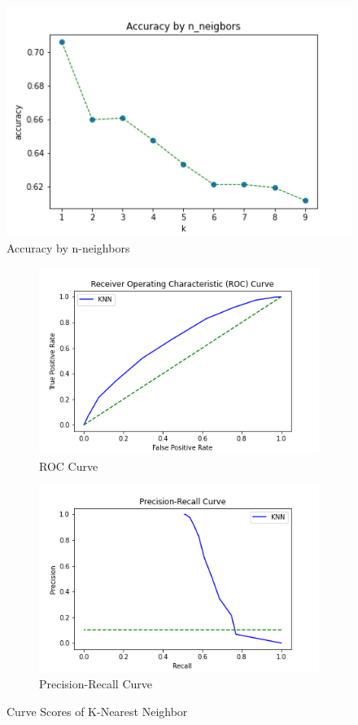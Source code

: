 \documentclass[11pt]{article}
\begin{document}
\begin{figure}[ht]
\centerline{\includegraphics[scale=0.35]{knn_plot.png}}
\label{fig:knnPlot}
\caption{Accuracy by n-neighbors}
\end{figure}

\begin{figure}[ht]
\begin{subfigure}{0.5\textwidth}
\includegraphics[scale=0.45]{roc_knn.png} 
\caption{ROC Curve}
\label{fig:rocKNN}
\end{subfigure}
\begin{subfigure}{0.5\textwidth}
\includegraphics[scale=0.45]{prs_knn.png}
\caption{Precision-Recall Curve}
\label{fig:prsKNN}
\end{subfigure}
\label{fig:csKNN}
\caption{Curve Scores of K-Nearest Neighbor}
\end{figure}
\end{document}
